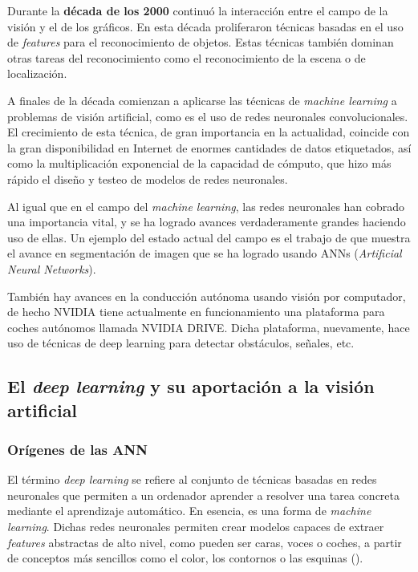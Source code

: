 Durante la \textbf{década de los 2000} continuó la interacción entre el campo de la visión y el de los gráficos. En esta década proliferaron técnicas basadas en el uso de \textit{features} para el reconocimiento de objetos. Estas técnicas también dominan otras tareas del reconocimiento como el reconocimiento de la escena o de localización.

A finales de la década comienzan a aplicarse las técnicas de \textit{machine learning} a problemas de visión artificial, como es el uso de redes neuronales convolucionales. El crecimiento de esta técnica, de gran importancia en la actualidad, coincide con la gran disponibilidad en Internet de enormes cantidades de datos etiquetados, así como la multiplicación exponencial de la capacidad de cómputo, que hizo más rápido el diseño y testeo de modelos de redes neuronales.

Al igual que en el campo del \textit{machine learning}, las redes neuronales han cobrado una importancia vital, y se ha logrado avances verdaderamente grandes haciendo uso de ellas. Un ejemplo del estado actual del campo es el trabajo de \citet{art:2017arXiv170306870H} que muestra el avance en segmentación de imagen que se ha logrado usando ANNs (\textit{Artificial Neural Networks}).

También hay avances en la conducción autónoma usando visión por computador, de hecho NVIDIA tiene actualmente en funcionamiento una plataforma para coches autónomos llamada NVIDIA DRIVE. Dicha plataforma, nuevamente, hace uso de técnicas de deep learning para detectar obstáculos, señales, etc.

\subsection{El \textit{deep learning} y su aportación a la visión artificial}
\subsubsection*{Orígenes de las ANN}

El término \textit{deep learning} se refiere al conjunto de técnicas basadas en redes neuronales que permiten a un ordenador aprender a resolver una tarea concreta mediante el aprendizaje automático. En esencia, es una forma de \textit{machine learning}. Dichas redes neuronales permiten crear modelos capaces de extraer \textit{features} abstractas de alto nivel, como pueden ser caras, voces o coches, a partir de conceptos más sencillos como el color, los contornos o las esquinas (\citet{book:Goodfellow-et-al-2016}).

